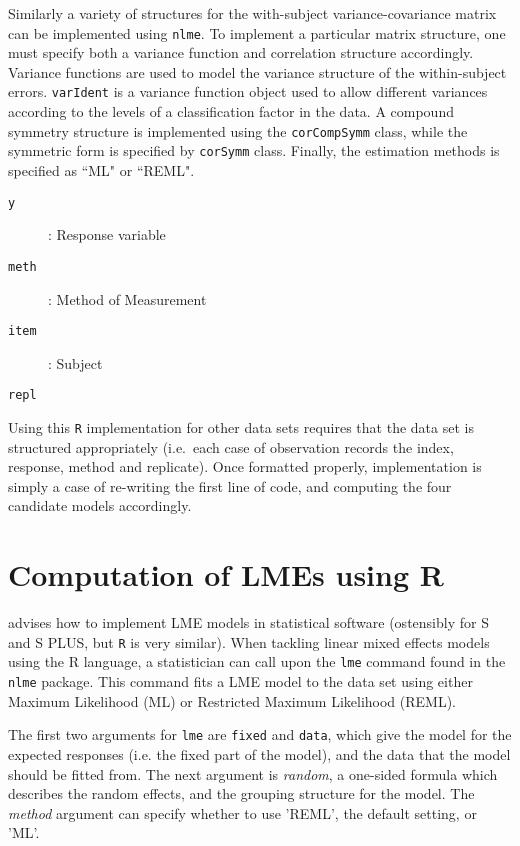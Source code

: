 Similarly a variety of structures for the with-subject variance-covariance matrix can be implemented using \texttt{nlme}. To implement a particular matrix structure, one must specify both a variance function and correlation structure accordingly. Variance functions are used to model the variance structure of the within-subject errors. \texttt{varIdent} is a variance function object used to allow different variances according to the levels of a classification factor in the data. A compound symmetry structure is implemented using the \texttt{corCompSymm} class, while the symmetric form is specified by \texttt{corSymm} class. Finally, the estimation methods is specified as ``ML" or ``REML".

\begin{description}
\item[\texttt{y}] : Response variable
\item[\texttt{meth}] : Method of Measurement
\item[\texttt{item}] : Subject
\item[\texttt{repl}] 
\end{description}

Using this \texttt{R} implementation for other data sets requires that the data set is structured appropriately (i.e.\ each case of observation records the index, response, method and replicate). Once formatted properly, implementation is simply a case of re-writing the first line of code, and computing the four candidate models accordingly.


\section{Computation of LMEs using R} 

\cite{PB} advises how to
implement LME models in statistical software (ostensibly for S and S PLUS, but \texttt{R} is very similar). When tackling linear mixed effects models using the R language, a statistician can call upon the \texttt{lme} command found in the \texttt{nlme} package. This command fits a LME model to the data set using either Maximum Likelihood (ML) or Restricted Maximum Likelihood (REML). 

The first two arguments for \texttt{lme} are \texttt{fixed} and \texttt{data}, which give the model for the expected responses (i.e. the fixed part of the model), and the data that the model should be fitted from. The next argument is  \emph{random}, a one-sided
formula which describes the random effects, and the grouping structure for the model. The  \emph{method} argument can specify whether to use 'REML', the default setting, or 'ML'.


